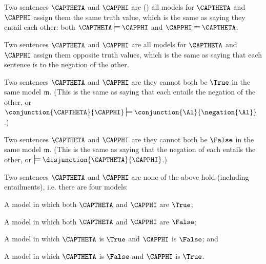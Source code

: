 \begin{majorILnc}{}
Two sentences $\CAPTHETA$ and $\CAPPHI$ are   () \Iff all models for $\CAPTHETA$ and $\CAPPHI$ assign them the same truth value, which is the same as saying they entail each other: both $\CAPTHETA\sdtstile{}{}\CAPPHI$ and $\CAPPHI\sdtstile{}{}\CAPTHETA$.
\end{majorILnc}
\begin{majorILnc}{}
Two sentences $\CAPTHETA$ and $\CAPPHI$ are  \Iff all models for $\CAPTHETA$ and $\CAPPHI$ assign them opposite truth values, which is the same as saying that each sentence is  to the negation of the other.
\end{majorILnc}
\begin{majorILnc}{}
Two sentences $\CAPTHETA$ and $\CAPPHI$ are  \Iff they cannot both be $\True$ in the same model $\mathfrak{m}$. (This is the same as saying that each entails the negation of the other, or $\conjunction{\CAPTHETA}{\CAPPHI}\sdtstile{}{}\conjunction{\Al}{\negation{\Al}}$.)
\end{majorILnc}
\begin{majorILnc}{}
Two sentences $\CAPTHETA$ and $\CAPPHI$ are  \Iff they cannot both be $\False$ in the same model $\mathfrak{m}$. (This is the same as saying that the negation of each entails the other, or $\sdtstile{}{}\disjunction{\CAPTHETA}{\CAPPHI}$.)
\end{majorILnc}
\begin{majorILnc}{}
Two sentences $\CAPTHETA$ and $\CAPPHI$ are  \Iff none of the above hold (including entailments), i.e. \Iff there are four models:
\begin{cenumerate}
\item A model in which both $\CAPTHETA$ and $\CAPPHI$ are $\True$; 
\item A model in which both $\CAPTHETA$ and $\CAPPHI$ are $\False$;
\item A model in which $\CAPTHETA$ is $\True$ and $\CAPPHI$ is $\False$; and
\item A model in which $\CAPTHETA$ is $\False$ and $\CAPPHI$ is $\True$.
\end{cenumerate}
\end{majorILnc}
